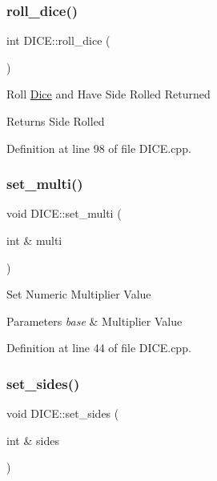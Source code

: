 \subsubsection{\texorpdfstring{roll\_dice()}{roll\_dice()}}
{\footnotesize\ttfamily int D\+I\+C\+E\+::roll\+\_\+dice (\begin{DoxyParamCaption}{ }\end{DoxyParamCaption})}



Roll \mbox{\hyperlink{namespace_dice}{Dice}} and Have Side Rolled Returned 

\begin{DoxyReturn}{Returns}
Side Rolled
\end{DoxyReturn}


Definition at line 98 of file D\+I\+C\+E.\+cpp.

\mbox{\label{class_d_i_c_e_a1ad51dd470d2fec9281f4d3b270b1018}} 
\subsubsection{\texorpdfstring{set\_multi()}{set\_multi()}}
{\footnotesize\ttfamily void D\+I\+C\+E\+::set\+\_\+multi (\begin{DoxyParamCaption}\item[{int \&}]{multi }\end{DoxyParamCaption})}



Set Numeric Multiplier Value 


\begin{DoxyParams}{Parameters}
{\em base} & Multiplier Value\\
\hline
\end{DoxyParams}


Definition at line 44 of file D\+I\+C\+E.\+cpp.

\mbox{\label{class_d_i_c_e_ac7478bfb76a2154fb905147fd27bc7c8}} 
\subsubsection{\texorpdfstring{set\_sides()}{set\_sides()}}
{\footnotesize\ttfamily void D\+I\+C\+E\+::set\+\_\+sides (\begin{DoxyParamCaption}\item[{int \&}]{sides }\end{DoxyParamCaption})}



